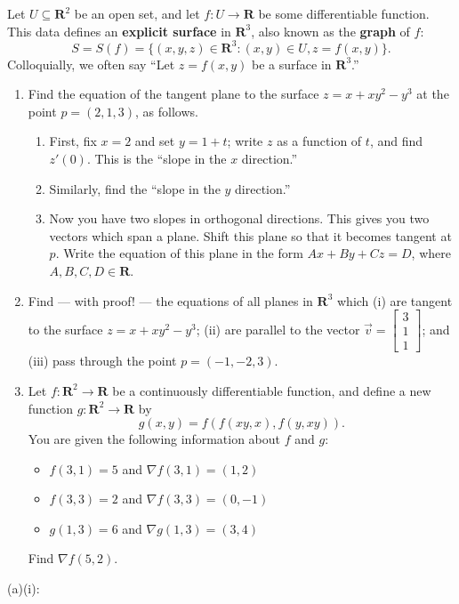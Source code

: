 \documentclass{article}
\newcommand{\R}{\mathbf{R}}
\theoremstyle{plain} %
\numberwithin{thm}{section} %
\theoremstyle{definition}
\begin{document}
    \begin{question}{29}
        Let $U\subseteq \R^2$ be an open set, and let $f:U\rightarrow \R$ be some differentiable function. This data defines an \textbf{explicit surface} in $\R^3$, also known as the \textbf{graph} of $f$:
        \[ S = S(f) = \{(x,y,z)\in \R^3 : (x,y)\in U, z=f(x,y)\}. \]
        Colloquially, we often say ``Let $z=f(x,y)$ be a surface in $\R^3$.''
        
        \begin{enumerate}[label=(\alph*)]
            \item Find the equation of the tangent plane to the surface $z=x+xy^2-y^3$ at the point $p=(2,1,3)$, as follows.
            \begin{enumerate}[label=(\roman*)]
                \item First, fix $x=2$ and set $y=1+t$; write $z$ as a function of $t$, and find $z'(0)$. This is the ``slope in the $x$ direction.''
                \item Similarly, find the ``slope in the $y$ direction.''
                \item Now you have two slopes in orthogonal directions. This gives you two vectors which span a plane. Shift this plane so that it becomes tangent at $p$. Write the equation of this plane in the form $Ax+By+Cz=D$, where $A,B,C,D\in \R$.
            \end{enumerate}
            
            \item Find --- with proof! --- the equations of all planes in $\R^3$ which (i) are tangent to the surface $z=x+xy^2-y^3$; (ii) are parallel to the vector $\vec{v}=\begin{bmatrix} 3 \\ 1 \\ 1\end{bmatrix}$; and (iii) pass through the point $p=(-1,-2,3)$.
            
            \item Let $f:\R^2\rightarrow \R$ be a continuously differentiable function, and define a new function $g:\R^2\rightarrow \R$ by
                \[ g(x,y) = f(f(xy,x),f(y,xy)). \]
            You are given the following information about $f$ and $g$:
                \begin{itemize}
                    \item $f(3,1)=5$ and $\nabla f(3,1)=(1,2)$
                    \item $f(3,3)=2$ and $\nabla f(3,3)=(0,-1)$
                    \item $g(1,3)=6$ and $\nabla g(1,3)=(3,4)$
                \end{itemize}
            Find $\nabla f(5,2)$.
        \end{enumerate}
        \tcblower
        (a)(i):


\end{question}
\end{document}
